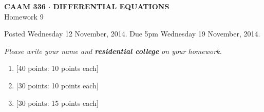 \documentclass[10pt]{article}
\begin{document}
\vspace*{-5em}
\begin{center}
\large \textsf{\textbf{CAAM 336 $\cdot$ DIFFERENTIAL EQUATIONS}\\[0.5em]
Homework 9 }
\end{center}

Posted Wednesday 12 November, 2014.  Due 5pm Wednesday 19 November, 2014.
\begin{center}
\emph{Please write your name and \textbf{residential college} on your homework.}
\end{center}

\begin{enumerate}
\item {[40 points: 10 points each]}\\


\item {[30 points: 10 points each]}\\

\item {[30 points: 15 points each]}\\


\end{enumerate}
\end{document}
